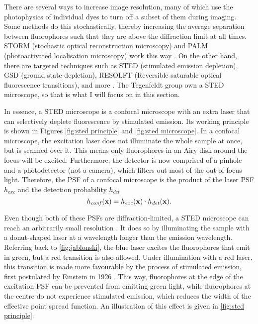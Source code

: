 There are several ways to increase image resolution, many of which use the photophysics of individual dyes to turn off a subset of them during imaging. Some methods do this stochastically, thereby increasing the average separation between fluorophores such that they are above the diffraction limit at all times. STORM (stochastic optical reconstruction microscopy) and PALM (photoactivated localisation microscopy) work this way \cite{Mock2009, Betzig2006}. On the other hand, there are targeted techniques such as STED (stimulated emission depletion), GSD (ground state depletion), RESOLFT (Reversible saturable optical fluorescence transitions), and more \cite{Klar2000, Folling2008, Hofmann2005}. The Tegenfeldt group own a STED microscope, so that is what I will focus on in this section. 

In essence, a STED microscope is a confocal microscope with an extra laser that can selectively deplete fluorescence by stimulated emission. Its working principle is shown in Figures \ref{fig:sted principle} and \ref{fig:sted microscope}. In a confocal microscope, the excitation laser does not illuminate the whole sample at once, but is scanned over it. This means only fluorophores in an Airy disk around the focus will be excited. Furthermore, the detector is now comprised of a pinhole and a photodetector (not a camera), which filters out most of the out-of-focus light. Therefore, the PSF of a confocal microscope is the product of the laser PSF $ h_\mathit{exc} $ and the detection probability $ h_\mathit{det} $
\begin{equation}
	h_\mathit{conf}(\vb{x}) = h_\mathit{exc}(\vb{x}) \cdot h_\mathit{det}(\vb{x}).
\end{equation}

Even though both of these PSFs are diffraction-limited, a STED microscope can reach an arbitrarily small resolution \cite{Wildanger2012}. It does so by illuminating the sample with a donut-shaped laser at a wavelength longer than the emission wavelength. Referring back to \autoref{fig:jablonski}, the blue laser excites the fluorophores that emit in green, but a red transition is also allowed. Under illumination with a red laser, this transition is made more favourable by the process of stimulated emission, first postulated by Einstein in 1926 \cite{Einstein1926}. This way, fluorophores at the edge of the excitation PSF can be prevented from emitting green light, while fluorophores at the centre do not experience stimulated emission, which reduces the width of the effective point spread function. An illustration of this effect is given in \autoref{fig:sted principle}.

